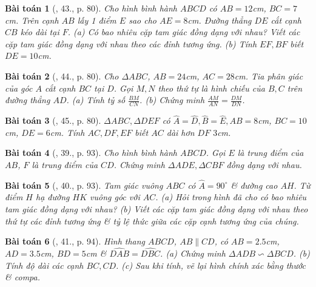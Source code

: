 \documentclass{article}
\newtheorem{baitoan}{Bài toán}
\begin{document}
\begin{baitoan}[\cite{SGK_Toan_8_tap_2}, 43., p. 80]
	Cho hình bình hành $ABCD$ có $AB = 12$\emph{cm}, $BC = 7$\emph{cm}. Trên cạnh $AB$ lấy 1 điểm $E$ sao cho $AE = 8$\emph{cm}. Đường thẳng $DE$ cắt cạnh $CB$ kéo dài tại $F$. (a) Có bao nhiêu cặp tam giác đồng dạng với nhau? Viết các cặp tam giác đồng dạng với nhau theo các đỉnh tương ứng. (b) Tính $EF,BF$ biết $DE = 10$\emph{cm}.
\end{baitoan}

\begin{baitoan}[\cite{SGK_Toan_8_tap_2}, 44., p. 80]
	Cho $\Delta ABC$, $AB = 24$\emph{cm}, $AC = 28$\emph{cm}. Tia phân giác của góc $A$ cắt cạnh $BC$ tại $D$. Gọi $M,N$ theo thứ tự là hình chiếu của $B,C$ trên đường thẳng $AD$. (a) Tính tỷ số $\frac{BM}{CN}$. (b) Chứng minh $\frac{AM}{AN} = \frac{DM}{DN}$.
\end{baitoan}

\begin{baitoan}[\cite{SGK_Toan_8_tap_2}, 45., p. 80]
	$\Delta ABC,\Delta DEF$ có $\widehat{A} = \widehat{D}, \widehat{B} = \widehat{E}, AB = 8$\emph{cm}, $BC = 10$\emph{cm}, $DE = 6$\emph{cm}. Tính $AC,DF,EF$ biết $AC$ dài hơn $DF$ $3$\emph{cm}.	
\end{baitoan}

\begin{baitoan}[\cite{SBT_Toan_8_tap_2}, 39., p. 93]
	Cho hình bình hành $ABCD$. Gọi $E$ là trung điểm của $AB$, $F$ là trung điểm của $CD$. Chứng minh $\Delta ADE,\Delta CBF$ đồng dạng với nhau.
\end{baitoan}

\begin{baitoan}[\cite{SBT_Toan_8_tap_2}, 40., p. 93]
	Tam giác vuông $ABC$ có $\widehat{A} = 90^\circ$ \& đường cao $AH$. Từ điểm $H$ hạ đường $HK$ vuông góc với $AC$. (a) Hỏi trong hình đã cho có bao nhiêu tam giác đồng dạng với nhau? (b) Viết các cặp tam giác đồng dạng với nhau theo thứ tự các đỉnh tương ứng \& tỷ lệ thức giữa các cặp cạnh tương ứng của chúng.
\end{baitoan}

\begin{baitoan}[\cite{SBT_Toan_8_tap_2}, 41., p. 94]
	 Hình thang $ABCD$, $AB\parallel CD$, có $AB = 2.5$\emph{cm}, $AD = 3.5$\emph{cm}, $BD = 5$\emph{cm} \& $\widehat{DAB} = \widehat{DBC}$. (a) Chứng minh $\Delta ADB\backsim\Delta BCD$. (b) Tính độ dài các cạnh $BC,CD$. (c) Sau khi tính, vẽ lại hình chính xác bằng thước \& compa.
\end{baitoan}
\end{document}
